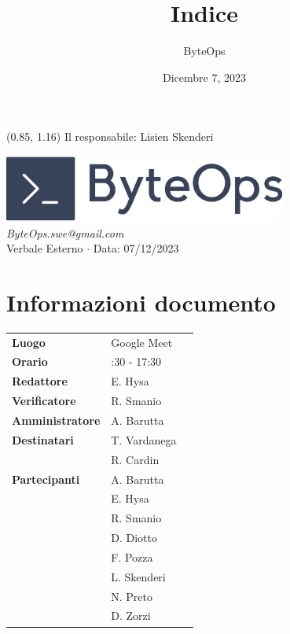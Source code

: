 \documentclass{article}
\title{\textbf{\fontsize{28}{6}\selectfont Indice}}
\author{\fontsize{14}{6}\selectfont ByteOps}
\date{Dicembre 7, 2023}
\begin{document}
\begin{textblock*}{\textwidth}(0.85\textwidth, 1.16\textheight)
    Il responsabile: Lisien Skenderi
\end{textblock*}

\pagestyle{fancy}
\begin{center}
\includegraphics[width = 0.7\textwidth]{../../Images/logo.png} \\
\vspace{0.2cm}
\textcolor[RGB]{60, 60, 60}{\textit{ByteOps.swe@gmail.com}} \\
\vspace{1cm}
\fontsize{16}{6}\selectfont Verbale Esterno $\cdot$ Data: 07/12/2023 \\
\vspace{0.5cm}
\end{center}

\section*{Informazioni documento}
\def\arraystretch{1.2}
\begin{tabular}{>{\raggedleft\arraybackslash}p{}|>{\raggedright\arraybackslash}p{}c}
\hline
\addlinespace
\textbf{Luogo} & Google Meet \vspace{10pt} \\
\textbf{Orario} & 16:30 - 17:30 \vspace{10pt} \\
\textbf{Redattore} & E. Hysa \vspace{10pt} \\
\textbf{Verificatore} & R. Smanio \vspace{10pt} \\
\textbf{Amministratore} & A. Barutta \vspace{10pt} \\
\textbf{Destinatari} & T. Vardanega \\ & R. Cardin \vspace{10pt} \\
\textbf{Partecipanti} & A. Barutta \\ & E. Hysa \\ & R. Smanio \\ & D. Diotto \\ & F. Pozza \\ & L. Skenderi \\ & N. Preto \\ & D. Zorzi \vspace{10pt}
\end{tabular}
\pagebreak 
\end{document}
